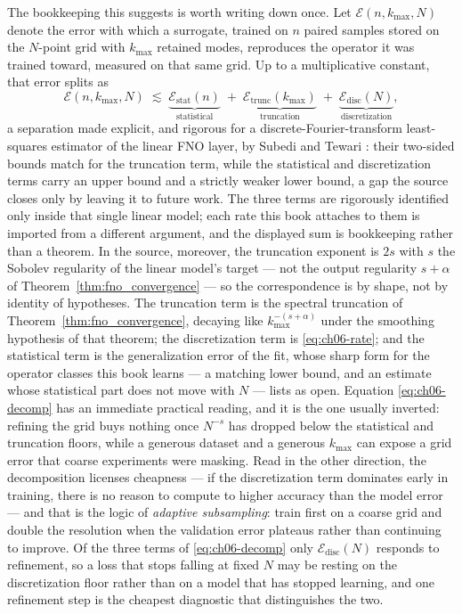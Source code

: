 The bookkeeping this suggests is worth writing down once. Let
$\mathcal{E}(n,k_{\max},N)$ denote the error with which a surrogate, trained on
$n$ paired samples stored on the $N$-point grid with $k_{\max}$ retained modes,
reproduces the operator it was trained toward, measured on that same grid. Up
to a multiplicative constant, that error splits as
\begin{equation}
  \label{eq:ch06-decomp}
  \mathcal{E}(n,k_{\max},N)
  \;\lesssim\;
  \underbrace{\mathcal{E}_{\mathrm{stat}}(n)}_{\text{statistical}}
  \;+\;
  \underbrace{\mathcal{E}_{\mathrm{trunc}}(k_{\max})}_{\text{truncation}}
  \;+\;
  \underbrace{\mathcal{E}_{\mathrm{disc}}(N)}_{\text{discretization}},
\end{equation}
a separation made explicit, and rigorous for
a discrete-Fourier-transform least-squares estimator of the linear FNO layer, by
Subedi and Tewari \cite{subedi2024controlling}: their two-sided bounds match for the truncation term, while the statistical and discretization terms carry an upper bound and a strictly weaker lower bound, a gap the source closes only by leaving it to future work. The three terms are rigorously identified only inside that single linear model; each rate this book attaches to them is imported from a different argument, and the displayed sum is bookkeeping rather than a theorem. In the source, moreover, the truncation exponent is $2s$ with $s$ the Sobolev regularity of the linear model's target --- not the output regularity $s+\alpha$ of Theorem~\ref{thm:fno_convergence} --- so the correspondence is by shape, not by identity of hypotheses.
The truncation term is the spectral truncation of
Theorem~\ref{thm:fno_convergence}, decaying like $k_{\max}^{-(s+\alpha)}$ under
the smoothing hypothesis of that theorem; the discretization term is
\eqref{eq:ch06-rate}; and the statistical term is the generalization error of the
fit, whose sharp form for the operator classes this book learns --- a matching
lower bound, and an estimate whose statistical part does not move with $N$ ---
 lists as open.
Equation \eqref{eq:ch06-decomp} has an immediate practical reading, and it is
the one usually inverted: refining the grid buys nothing once $N^{-s}$ has
dropped below the statistical and truncation floors, while a generous dataset
and a generous $k_{\max}$ can expose a grid error that coarse experiments were
masking. Read in the other direction, the decomposition licenses cheapness ---
if the discretization term dominates early in training, there is no reason to
compute to higher accuracy than the model error --- and that is the logic of
\emph{adaptive subsampling}: train first on a coarse
grid and double the resolution when the validation error plateaus rather than
continuing to improve. Of the three terms of \eqref{eq:ch06-decomp} only
$\mathcal{E}_{\mathrm{disc}}(N)$ responds to refinement, so a loss that stops
falling at fixed $N$ may be resting on the discretization floor rather than on a
model that has stopped learning, and one refinement step is the cheapest
diagnostic that distinguishes the two.

